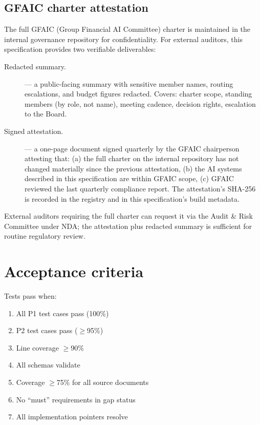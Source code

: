 \documentclass[11pt,a4paper,twoside]{report}
\begin{document}
\subsection{GFAIC charter attestation}\label{sec:gfaic-attestation}

The full GFAIC (Group Financial AI Committee) charter is
maintained in the internal governance repository for
confidentiality. For external auditors, this specification
provides two verifiable deliverables:

\begin{description}
\item[Redacted summary.]
 --- a
public-facing summary with sensitive member names, routing
escalations, and budget figures redacted. Covers:
charter scope, standing members (by role, not name), meeting
cadence, decision rights, escalation to the Board.
\item[Signed attestation.]
 ---
a one-page document signed quarterly by the GFAIC
chairperson attesting that: (a) the full charter on
the internal repository has not changed materially
since the previous attestation, (b) the AI systems
described in this specification are within GFAIC scope,
(c) GFAIC reviewed the last quarterly compliance
report. The attestation's SHA-256 is recorded in the
registry and in this specification's build metadata.
\end{description}

\noindent
External auditors requiring the full charter can request it via
the Audit \& Risk Committee under NDA; the attestation plus
redacted summary is sufficient for routine regulatory review.

\section{Acceptance criteria}

Tests pass when:
\begin{enumerate}
\item All P1 test cases pass (100\%)
\item P2 test cases pass ($\geq$95\%)
\item Line coverage $\geq$90\%
\item All schemas validate
\item Coverage $\geq$75\% for all source documents
\item No ``must'' requirements in gap status
\item All implementation pointers resolve
\end{enumerate}
\end{document}
